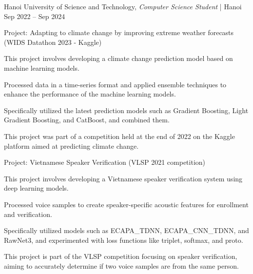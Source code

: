 \vspace{8pt}

\begin{cventries2}

  \cventrynew
  {Hanoi University of Science and Technology, \textnormal{\textit{Computer Science Student} | Hanoi}}
  {Sep 2022 -- Sep 2024}
  {}

\end{cventries2}

\vspace{-10pt}

\begin{cventries}

  \cventry
    {Project: Adapting to climate change by improving extreme weather forecasts (WIDS Datathon 2023 - Kaggle)}
    {}
    {
      \begin{cvitems}
        \item {This project involves developing a climate change prediction model based on machine learning models.}
        \item {Processed data in a time-series format and applied ensemble techniques to enhance the performance of the machine learning models.}
        \item {Specifically utilized the latest prediction models such as Gradient Boosting, Light Gradient Boosting, and CatBoost, and combined them.}
        \item {This project was part of a competition held at the end of 2022 on the Kaggle platform aimed at predicting climate change.}
      \end{cvitems}
    }

\vspace{8pt}

  \cventry
    {Project: Vietnamese Speaker Verification (VLSP 2021 competition)}
    {}
    {
      \begin{cvitems}
        \item {This project involves developing a Vietnamese speaker verification system using deep learning models.}
        \item {Processed voice samples to create speaker-specific acoustic features for enrollment and verification.}
        \item {Specifically utilized models such as ECAPA\_TDNN, ECAPA\_CNN\_TDNN, and RawNet3, and experimented with loss functions like triplet, softmax, and proto.}
        \item {This project is part of the VLSP competition focusing on speaker verification, aiming to accurately determine if two voice samples are from the same person.}
      \end{cvitems}
    }


\end{cventries}
